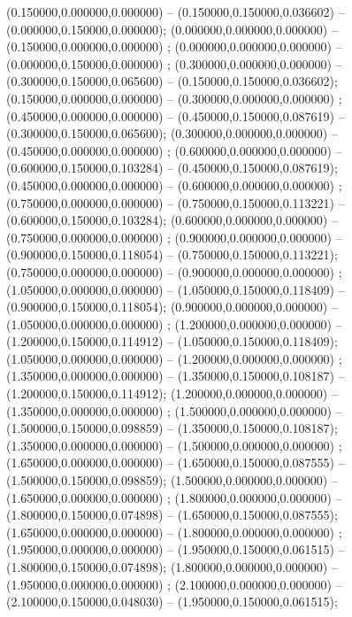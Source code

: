  (0.150000,0.000000,0.000000) -- (0.150000,0.150000,0.036602) -- (0.000000,0.150000,0.000000);
 (0.000000,0.000000,0.000000) -- (0.150000,0.000000,0.000000) ;
 (0.000000,0.000000,0.000000) -- (0.000000,0.150000,0.000000) ;
 (0.300000,0.000000,0.000000) -- (0.300000,0.150000,0.065600) -- (0.150000,0.150000,0.036602);
 (0.150000,0.000000,0.000000) -- (0.300000,0.000000,0.000000) ;
 (0.450000,0.000000,0.000000) -- (0.450000,0.150000,0.087619) -- (0.300000,0.150000,0.065600);
 (0.300000,0.000000,0.000000) -- (0.450000,0.000000,0.000000) ;
 (0.600000,0.000000,0.000000) -- (0.600000,0.150000,0.103284) -- (0.450000,0.150000,0.087619);
 (0.450000,0.000000,0.000000) -- (0.600000,0.000000,0.000000) ;
 (0.750000,0.000000,0.000000) -- (0.750000,0.150000,0.113221) -- (0.600000,0.150000,0.103284);
 (0.600000,0.000000,0.000000) -- (0.750000,0.000000,0.000000) ;
 (0.900000,0.000000,0.000000) -- (0.900000,0.150000,0.118054) -- (0.750000,0.150000,0.113221);
 (0.750000,0.000000,0.000000) -- (0.900000,0.000000,0.000000) ;
 (1.050000,0.000000,0.000000) -- (1.050000,0.150000,0.118409) -- (0.900000,0.150000,0.118054);
 (0.900000,0.000000,0.000000) -- (1.050000,0.000000,0.000000) ;
 (1.200000,0.000000,0.000000) -- (1.200000,0.150000,0.114912) -- (1.050000,0.150000,0.118409);
 (1.050000,0.000000,0.000000) -- (1.200000,0.000000,0.000000) ;
 (1.350000,0.000000,0.000000) -- (1.350000,0.150000,0.108187) -- (1.200000,0.150000,0.114912);
 (1.200000,0.000000,0.000000) -- (1.350000,0.000000,0.000000) ;
 (1.500000,0.000000,0.000000) -- (1.500000,0.150000,0.098859) -- (1.350000,0.150000,0.108187);
 (1.350000,0.000000,0.000000) -- (1.500000,0.000000,0.000000) ;
 (1.650000,0.000000,0.000000) -- (1.650000,0.150000,0.087555) -- (1.500000,0.150000,0.098859);
 (1.500000,0.000000,0.000000) -- (1.650000,0.000000,0.000000) ;
 (1.800000,0.000000,0.000000) -- (1.800000,0.150000,0.074898) -- (1.650000,0.150000,0.087555);
 (1.650000,0.000000,0.000000) -- (1.800000,0.000000,0.000000) ;
 (1.950000,0.000000,0.000000) -- (1.950000,0.150000,0.061515) -- (1.800000,0.150000,0.074898);
 (1.800000,0.000000,0.000000) -- (1.950000,0.000000,0.000000) ;
 (2.100000,0.000000,0.000000) -- (2.100000,0.150000,0.048030) -- (1.950000,0.150000,0.061515);
